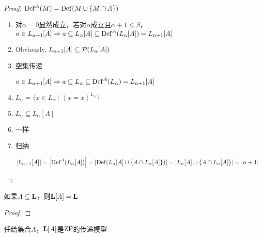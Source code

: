 \documentclass[11pt]{article}
\begin{document}
\begin{proof}
\(\operatorname{Def}^A(M)=\operatorname{Def}(M\cup\{M\cap A\})\)
\begin{enumerate}
\item 对\(\alpha=0\)显然成立，若对\(\alpha\)成立且\(\alpha+1\le\beta\)，\(a\in L_{\alpha+1}[A]\Rightarrow a\subseteq L_\alpha[A]\subseteq\operatorname{Def}^A(L_\alpha[A])=L_{\alpha+1}[A]\)
\item Obviously, \(L_{\alpha+1}[A]\subseteq\mathcal{P}(L_\alpha[A])\)
\item 空集传递

\(a\in L_{\alpha+1}[A]\Rightarrow a\subseteq L_\alpha\subseteq\operatorname{Def}^A(L_\alpha)=L_{\alpha+1}[A]\)
\item \(L_\alpha=\{x\in L_\alpha\mid(x=x)^{L_\alpha}\}\)
\item \(L_\alpha\subseteq L_\alpha[A]\)
\item 一样
\item 归纳

\(\abs{L_{\alpha+1}[A]}=\abs{\Def^A(L_\alpha[A])}=\abs{\Def(L_\alpha[A]\cup\{A\cap L_\alpha[A]\})}=\abs{L_\alpha[A]\cup\{A\cap L_\alpha[A]\}}=\abs{\alpha+1}\)
\end{enumerate}
\end{proof}

\begin{exercise}[8.4.10]
如果\(A\subseteq\operatorname{\textbf{L}}\)，则\(\operatorname{\textbf{L}}[A]=\operatorname{\textbf{L}}\)
\end{exercise}

\begin{proof}

\end{proof}

\begin{exercise}[8.4.11]
任给集合\(A\)，\(\operatorname{\textbf{L}}[A]\)是\(\operatorname{ZF}\)的传递模型
\end{exercise}
\end{document}
